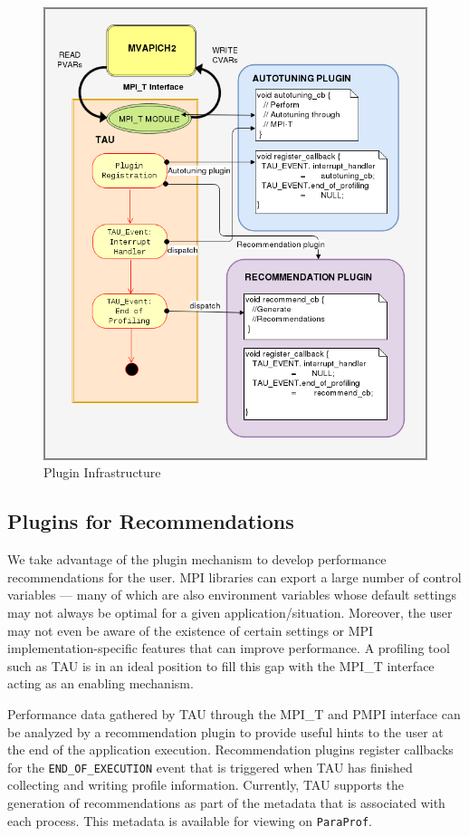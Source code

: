\begin{center}
        \begin{figure}[tbp!]
         \centering
                \includegraphics[scale=0.5,width=\columnwidth,keepaspectratio]{figures/Plugin_Infrastructure}
                \caption{Plugin Infrastructure}
                \label{fig:plugininfrastructure}
        \end{figure}
\end{center}

\subsection{Plugins for Recommendations}
We take advantage of the plugin mechanism to develop performance recommendations for the user. MPI libraries can export a large number of control variables --- many of which are also environment variables whose default settings may not always be optimal for a given application/situation. Moreover, the user may not even be aware of the existence of certain settings or MPI implementation-specific features that can improve performance. A profiling tool such as TAU is in an ideal position to fill this gap with the MPI\_T interface acting as an enabling mechanism. \par Performance data gathered by TAU through the MPI\_T and PMPI interface can be analyzed by a recommendation plugin to provide useful hints to the user at the end of the application execution. Recommendation plugins register callbacks for the \verb+END_OF_EXECUTION+ event that is triggered when TAU has finished collecting and writing profile information. Currently, TAU supports the generation of recommendations as part of the metadata that is associated with each process. This metadata is available for viewing on \verb+ParaProf+.


